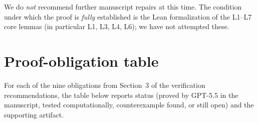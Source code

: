 \documentclass[11pt]{article}
\begin{document}
We do \emph{not} recommend further manuscript repairs at this time.
The condition under which the proof is \emph{fully} established is
the Lean formalization of the L1--L7 core lemmas (in particular L1,
L3, L4, L6); we have not attempted these.

\section{Proof-obligation table}

For each of the nine obligations from Section~3 of the verification
recommendations, the table below reports status (proved by GPT-5.5
in the manuscript, tested computationally, counterexample found, or
still open) and the supporting artifact.
\end{document}
